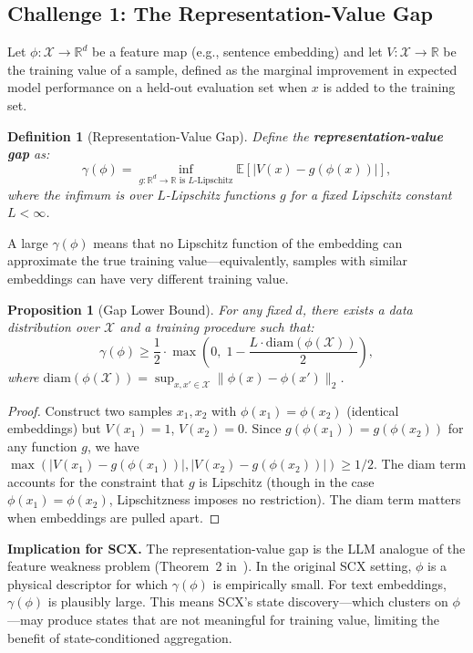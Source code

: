 \documentclass[11pt]{article}
\newtheorem{definition}{Definition}[section]
\newtheorem{proposition}{Proposition}[section]
\newcommand{\E}{\mathbb{E}}
\newcommand{\R}{\mathbb{R}}
\newcommand{\cX}{\mathcal{X}}
\begin{document}
\subsection{Challenge 1: The Representation-Value Gap}

Let $\phi: \cX \to \R^d$ be a feature map (e.g., sentence embedding) and let $V: \cX \to \R$ be the training value of a sample, defined as the marginal improvement in expected model performance on a held-out evaluation set when $x$ is added to the training set.

\begin{definition}[Representation-Value Gap]
Define the \textbf{representation-value gap} as:
\begin{equation}
\gamma(\phi) = \inf_{g: \R^d \to \R \text{ is } L\text{-Lipschitz}} \E[|V(x) - g(\phi(x))|],
\label{eq:rep_value_gap}
\end{equation}
where the infimum is over $L$-Lipschitz functions $g$ for a fixed Lipschitz constant $L < \infty$.
\end{definition}

A large $\gamma(\phi)$ means that no Lipschitz function of the embedding can approximate the true training value---equivalently, samples with similar embeddings can have very different training value.

\begin{proposition}[Gap Lower Bound]
For any fixed $d$, there exists a data distribution over $\cX$ and a training procedure such that:
\begin{equation}
\gamma(\phi) \geq \frac{1}{2} \cdot \max\left(0,\; 1 - \frac{L \cdot \text{diam}(\phi(\cX))}{2}\right),
\label{eq:gap_lower_bound}
\end{equation}
where $\text{diam}(\phi(\cX)) = \sup_{x,x' \in \cX} \|\phi(x) - \phi(x')\|_2$.
\end{proposition}

\begin{proof}
Construct two samples $x_1, x_2$ with $\phi(x_1) = \phi(x_2)$ (identical embeddings) but $V(x_1) = 1$, $V(x_2) = 0$. Since $g(\phi(x_1)) = g(\phi(x_2))$ for any function $g$, we have $\max(|V(x_1) - g(\phi(x_1))|, |V(x_2) - g(\phi(x_2))|) \geq 1/2$. The diam term accounts for the constraint that $g$ is Lipschitz (though in the case $\phi(x_1) = \phi(x_2)$, Lipschitzness imposes no restriction). The diam term matters when embeddings are pulled apart.
\end{proof}

\textbf{Implication for SCX.} The representation-value gap is the LLM analogue of the feature weakness problem (Theorem~2 in~\cite{scx2026}). In the original SCX setting, $\phi$ is a physical descriptor for which $\gamma(\phi)$ is empirically small. For text embeddings, $\gamma(\phi)$ is plausibly large. This means SCX's state discovery---which clusters on $\phi$---may produce states that are not meaningful for training value, limiting the benefit of state-conditioned aggregation.
\end{document}
